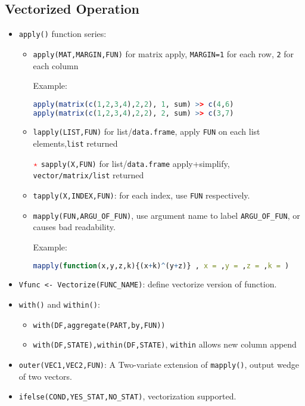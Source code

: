 \subsection{Vectorized Operation}\label{SubSubSectionVectorizedOperation}
\begin{itemize}[topsep=2pt,itemsep=0pt]
    \item \lstinline|apply()| function series:
\begin{itemize}[topsep=2pt,itemsep=0pt]
    \item \lstinline|apply(MAT,MARGIN,FUN)| for matrix apply, \lstinline|MARGIN=1| for each row, \lstinline|2| for each column
    
Example:
\begin{lstlisting}[language=R]
apply(matrix(c(1,2,3,4),2,2), 1, sum) >> c(4,6)
apply(matrix(c(1,2,3,4),2,2), 2, sum) >> c(3,7)
\end{lstlisting}
    \item \lstinline|lapply(LIST,FUN)| for list/\lstinline|data.frame|, apply \lstinline|FUN| on each list elements,\lstinline|list| returned
    \item[$ \color{red}\star $] \lstinline|sapply(X,FUN)| for list/\lstinline|data.frame| apply+simplify, \lstinline|vector/matrix/list| returned
    \item \lstinline|tapply(X,INDEX,FUN)|: for each index, use \lstinline|FUN| respectively.
    \item \lstinline|mapply(FUN,ARGU_OF_FUN)|, use argument name to label \lstinline|ARGU_OF_FUN|, or causes bad readability. 
    
    Example:
\begin{lstlisting}[language=R]
mapply(function(x,y,z,k){(x+k)^(y+z)} , x = ,y = ,z = ,k = )
\end{lstlisting}
    \end{itemize}

    \item \lstinline|Vfunc <- Vectorize(FUNC_NAME)|: define vectorize version of function.
    \item \lstinline|with()| and \lstinline|within()|:
    \begin{itemize}[topsep=2pt,itemsep=0pt]
         \item \lstinline|with(DF,aggregate(PART,by,FUN))|
        \item \lstinline|with(DF,STATE),within(DF,STATE)|,
     \lstinline|within| allows new column append
    \end{itemize}
    \item \lstinline|outer(VEC1,VEC2,FUN)|: A Two-variate extension of \lstinline|mapply()|, output wedge of two vectors.
    \item \lstinline|ifelse(COND,YES_STAT,NO_STAT)|, vectorization supported.
\end{itemize}





